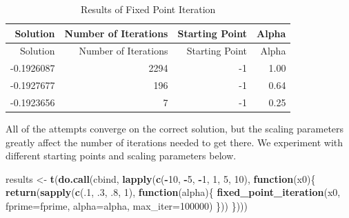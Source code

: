 \documentclass[]{article}
\newenvironment{Shaded}{\begin{snugshade}}{\end{snugshade}}
\newcommand{\KeywordTok}[1]{\textcolor[rgb]{0.13,0.29,0.53}{\textbf{#1}}}
\newcommand{\DataTypeTok}[1]{\textcolor[rgb]{0.13,0.29,0.53}{#1}}
\newcommand{\DecValTok}[1]{\textcolor[rgb]{0.00,0.00,0.81}{#1}}
\newcommand{\StringTok}[1]{\textcolor[rgb]{0.31,0.60,0.02}{#1}}
\newcommand{\ControlFlowTok}[1]{\textcolor[rgb]{0.13,0.29,0.53}{\textbf{#1}}}
\newcommand{\OperatorTok}[1]{\textcolor[rgb]{0.81,0.36,0.00}{\textbf{#1}}}
\newcommand{\NormalTok}[1]{#1}
\begin{document}
\begin{longtable}[]{@{}rrrr@{}}
\caption{Results of Fixed Point Iteration}\tabularnewline
\toprule
Solution & Number of Iterations & Starting Point & Alpha\tabularnewline
\midrule
\endfirsthead
\toprule
Solution & Number of Iterations & Starting Point & Alpha\tabularnewline
\midrule
\endhead
-0.1926087 & 2294 & -1 & 1.00\tabularnewline
-0.1927677 & 196 & -1 & 0.64\tabularnewline
-0.1923656 & 7 & -1 & 0.25\tabularnewline
\bottomrule
\end{longtable}

All of the attempts converge on the correct solution, but the scaling
parameters greatly affect the number of iterations needed to get there.
We experiment with different starting points and scaling parameters
below.

\begin{Shaded}
\begin{Highlighting}[]
\NormalTok{results <-}\StringTok{ }\KeywordTok{t}\NormalTok{(}\KeywordTok{do.call}\NormalTok{(cbind, }\KeywordTok{lapply}\NormalTok{(}\KeywordTok{c}\NormalTok{(}\OperatorTok{-}\DecValTok{10}\NormalTok{, }\OperatorTok{-}\DecValTok{5}\NormalTok{, }\OperatorTok{-}\DecValTok{1}\NormalTok{, }\DecValTok{1}\NormalTok{, }\DecValTok{5}\NormalTok{, }\DecValTok{10}\NormalTok{), }\ControlFlowTok{function}\NormalTok{(x0)\{}
  \KeywordTok{return}\NormalTok{(}\KeywordTok{sapply}\NormalTok{(}\KeywordTok{c}\NormalTok{(.}\DecValTok{1}\NormalTok{, .}\DecValTok{3}\NormalTok{, .}\DecValTok{8}\NormalTok{, }\DecValTok{1}\NormalTok{), }\ControlFlowTok{function}\NormalTok{(alpha)\{}
    \KeywordTok{fixed_point_iteration}\NormalTok{(x0, }\DataTypeTok{fprime=}\NormalTok{fprime, }\DataTypeTok{alpha=}\NormalTok{alpha, }\DataTypeTok{max_iter=}\DecValTok{100000}\NormalTok{)  }
\NormalTok{  \}))  }
\NormalTok{\})))}
\end{Highlighting}
\end{Shaded}
\end{document}
